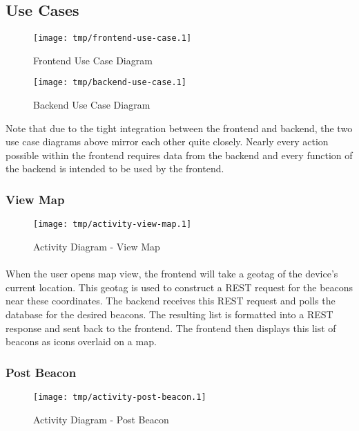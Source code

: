     \subsection{Use Cases}
        \begin{figure}[H]
            \centering
            \texttt{[image: tmp/frontend-use-case.1]} 
            \caption{Frontend Use Case Diagram}
        \end{figure}

        \begin{figure}[H]
            \centering
            \texttt{[image: tmp/backend-use-case.1]} 
            \caption{Backend Use Case Diagram}
        \end{figure}

        Note that due to the tight integration between the frontend and backend,
        the two use case diagrams above mirror each other quite closely.
        Nearly every action possible within the frontend requires data from the
        backend and every function of the backend is intended to be used by the
        frontend.

        \subsubsection{View Map}
        \begin{figure}[H]
            \centering
            \texttt{[image: tmp/activity-view-map.1]} 
            \caption{Activity Diagram - View Map}
        \end{figure}

        \paragraph*{}
        When the user opens map view, the frontend will take a geotag of the device's
        current location. This geotag is used to construct a REST request
        for the beacons near these coordinates.
        The backend receives this REST request and polls the database for the desired
        beacons. The resulting list is formatted into a REST response and sent back
        to the frontend. The frontend then displays this list of beacons as icons
        overlaid on a map.

        \subsubsection{Post Beacon}
        \begin{figure}[H]
            \centering
            \texttt{[image: tmp/activity-post-beacon.1]} 
            \caption{Activity Diagram - Post Beacon}
        \end{figure}

